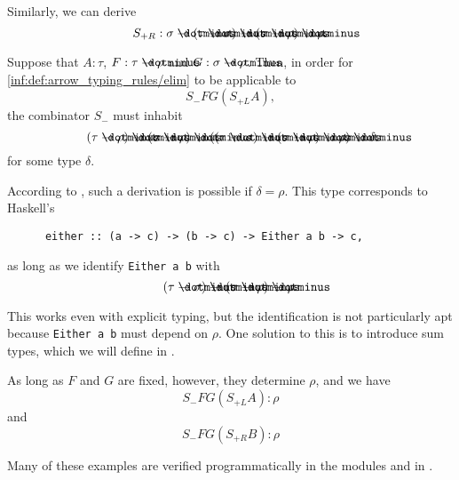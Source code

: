 \begin{example}
\begin{thmenum}
    Similarly, we can derive
    \begin{equation*}
      S_{+R}: \sigma \synimplies (\tau \synimplies \sigma) \synimplies (\sigma \synimplies \rho) \synimplies \rho.
    \end{equation*}

    Suppose that \( A: \tau \), \( F: \tau \synimplies \rho \) and \( G: \sigma \synimplies \rho \). Then, in order for \ref{inf:def:arrow_typing_rules/elim} to be applicable to
    \begin{equation*}
      S_- F G (S_{+L} A),
    \end{equation*}
    the combinator \( S_- \) must inhabit
    \begin{equation*}
      (\tau \synimplies \rho) \synimplies (\sigma \synimplies \rho) \synimplies ((\tau \synimplies \sigma) \synimplies (\sigma \synimplies \rho) \synimplies \rho) \synimplies \delta
    \end{equation*}
    for some type \( \delta \).

    According to , such a derivation is possible if \( \delta = \rho \). This type corresponds to Haskell's
    \begin{verbatim}
      either :: (a -> c) -> (b -> c) -> Either a b -> c,
    \end{verbatim}\vspace{-\baselineskip}
    as long as we identify \verb|Either a b| with
    \begin{equation*}
      (\tau \synimplies \sigma) \synimplies (\sigma \synimplies \rho) \synimplies \rho.
    \end{equation*}

    This works even with explicit typing, but the identification is not particularly apt because \verb|Either a b| must depend on \( \rho \). One solution to this is to introduce sum types, which we will define in .

    As long as \( F \) and \( G \) are fixed, however, they determine \( \rho \), and we have
    \begin{equation*}
      S_- F G (S_{+L} A): \rho
    \end{equation*}
    and
    \begin{equation*}
      S_- F G (S_{+R} B): \rho
    \end{equation*}
  \end{thmenum}
\end{example}
\begin{comments}
  \item Many of these examples are verified programmatically in the modules  and  in \cite{notebook:code}.
\end{comments}

